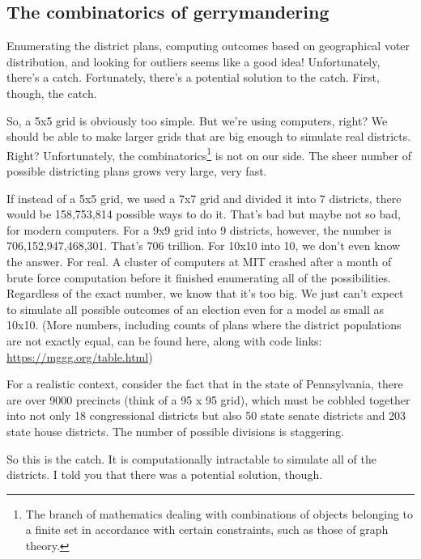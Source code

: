 \documentclass[
  openany]{book}
\begin{document}
\hypertarget{the-combinatorics-of-gerrymandering}{%
\subsection*{The combinatorics of gerrymandering}\label{the-combinatorics-of-gerrymandering}}

Enumerating the district plans, computing outcomes based on geographical voter distribution, and looking for outliers seems like a good idea! Unfortunately, there's a catch. Fortunately, there's a potential solution to the catch. First, though, the catch.

So, a 5x5 grid is obviously too simple. But we're using computers, right? We should be able to make larger grids that are big enough to simulate real districts. Right? Unfortunately, the combinatorics\footnote{The branch of mathematics dealing with combinations of objects belonging to a finite set in accordance with certain constraints, such as those of graph theory.} is not on our side. The sheer number of possible districting plans grows very large, very fast.

If instead of a 5x5 grid, we used a 7x7 grid and divided it into 7 districts, there would be 158,753,814 possible ways to do it. That's bad but maybe not so bad, for modern computers. For a 9x9 grid into 9 districts, however, the number is 706,152,947,468,301. That's 706 trillion. For 10x10 into 10, we don't even know the answer. For real. A cluster of computers at MIT crashed after a month of brute force computation before it finished enumerating all of the possibilities. Regardless of the exact number, we know that it's too big. We just can't expect to simulate all possible outcomes of an election even for a model as small as 10x10. (More numbers, including counts of plans where the district populations are not exactly equal, can be found here, along with code links: \url{https://mggg.org/table.html})

For a realistic context, consider the fact that in the state of Pennsylvania, there are over 9000 precincts (think of a 95 x 95 grid), which must be cobbled together into not only 18 congressional districts but also 50 state senate districts and 203 state house districts. The number of possible divisions is staggering.

So this is the catch. It is computationally intractable to simulate all of the districts. I told you that there was a potential solution, though.
\end{document}
